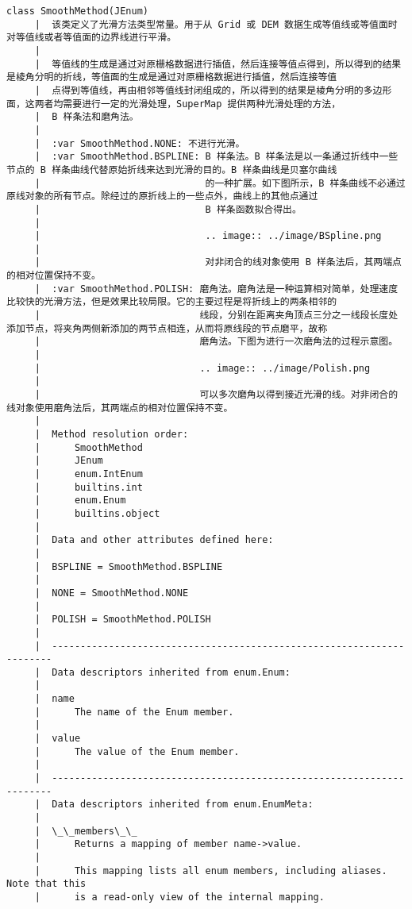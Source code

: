 \documentclass[11pt]{article}
\begin{document}
\begin{Verbatim}[commandchars=\\\{\}]
    class SmoothMethod(JEnum)
     |  该类定义了光滑方法类型常量。用于从 Grid 或 DEM 数据生成等值线或等值面时对等值线或者等值面的边界线进行平滑。
     |  
     |  等值线的生成是通过对原栅格数据进行插值，然后连接等值点得到，所以得到的结果是棱角分明的折线，等值面的生成是通过对原栅格数据进行插值，然后连接等值
     |  点得到等值线，再由相邻等值线封闭组成的，所以得到的结果是棱角分明的多边形面，这两者均需要进行一定的光滑处理，SuperMap 提供两种光滑处理的方法，
     |  B 样条法和磨角法。
     |  
     |  :var SmoothMethod.NONE: 不进行光滑。
     |  :var SmoothMethod.BSPLINE: B 样条法。B 样条法是以一条通过折线中一些节点的 B 样条曲线代替原始折线来达到光滑的目的。B 样条曲线是贝塞尔曲线
     |                             的一种扩展。如下图所示，B 样条曲线不必通过原线对象的所有节点。除经过的原折线上的一些点外，曲线上的其他点通过
     |                             B 样条函数拟合得出。
     |  
     |                             .. image:: ../image/BSpline.png
     |  
     |                             对非闭合的线对象使用 B 样条法后，其两端点的相对位置保持不变。
     |  :var SmoothMethod.POLISH: 磨角法。磨角法是一种运算相对简单，处理速度比较快的光滑方法，但是效果比较局限。它的主要过程是将折线上的两条相邻的
     |                            线段，分别在距离夹角顶点三分之一线段长度处添加节点，将夹角两侧新添加的两节点相连，从而将原线段的节点磨平，故称
     |                            磨角法。下图为进行一次磨角法的过程示意图。
     |  
     |                            .. image:: ../image/Polish.png
     |  
     |                            可以多次磨角以得到接近光滑的线。对非闭合的线对象使用磨角法后，其两端点的相对位置保持不变。
     |  
     |  Method resolution order:
     |      SmoothMethod
     |      JEnum
     |      enum.IntEnum
     |      builtins.int
     |      enum.Enum
     |      builtins.object
     |  
     |  Data and other attributes defined here:
     |  
     |  BSPLINE = SmoothMethod.BSPLINE
     |  
     |  NONE = SmoothMethod.NONE
     |  
     |  POLISH = SmoothMethod.POLISH
     |  
     |  ----------------------------------------------------------------------
     |  Data descriptors inherited from enum.Enum:
     |  
     |  name
     |      The name of the Enum member.
     |  
     |  value
     |      The value of the Enum member.
     |  
     |  ----------------------------------------------------------------------
     |  Data descriptors inherited from enum.EnumMeta:
     |  
     |  \_\_members\_\_
     |      Returns a mapping of member name->value.
     |      
     |      This mapping lists all enum members, including aliases. Note that this
     |      is a read-only view of the internal mapping.
    

\end{Verbatim}
\end{document}

